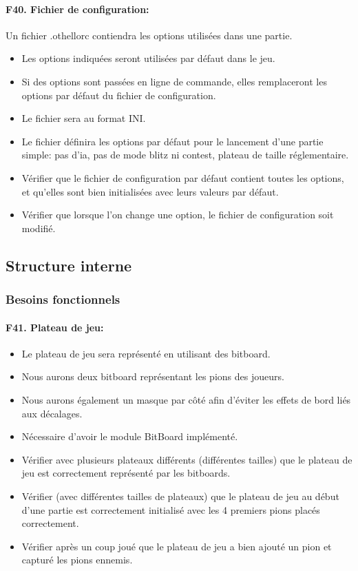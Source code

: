\documentclass[a4paper,12pt]{article}
\begin{document}
\paragraph{F40. Fichier de configuration:} Un fichier .othellorc contiendra les options utilisées dans une partie.
\begin{itemize}
  \item Les options indiquées seront utilisées par défaut dans le jeu.
  \item Si des options sont passées en ligne de commande, elles remplaceront les
        options par défaut du fichier de configuration.
  \item Le fichier sera au format INI.
  \item Le fichier définira les options par défaut pour le lancement d'une partie
        simple: pas d'ia, pas de mode blitz ni contest, plateau de taille
        réglementaire.
  \item Vérifier que le fichier de configuration par défaut contient toutes les
        options, et qu'elles sont bien initialisées avec leurs valeurs par défaut.
  \item Vérifier que lorsque l'on change une option, le fichier de configuration soit
        modifié.
\end{itemize}

\subsection{Structure interne}

\subsubsection{Besoins fonctionnels}

\paragraph{F41. Plateau de jeu:}
\begin{itemize}
  \item Le plateau de jeu sera représenté en utilisant des bitboard.
  \item Nous aurons deux bitboard représentant les pions des joueurs.
  \item Nous aurons également un masque par côté afin d'éviter les effets de bord liés
        aux décalages.
  \item Nécessaire d'avoir le module BitBoard implémenté.
  \item Vérifier avec plusieurs plateaux différents (différentes tailles) que le
        plateau de jeu est correctement représenté par les bitboards.
  \item Vérifier (avec différentes tailles de plateaux) que le plateau de jeu au début
        d'une partie est correctement initialisé avec les 4 premiers pions placés
        correctement.
  \item Vérifier après un coup joué que le plateau de jeu a bien ajouté un pion et
        capturé les pions ennemis.
\end{itemize}
\end{document}
